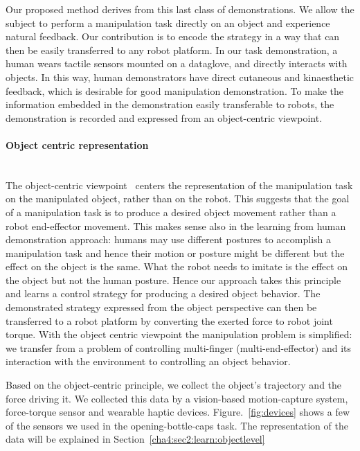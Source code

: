 Our proposed method derives from this last class of demonstrations.
We allow the subject to perform a manipulation task directly on an object and experience natural feedback. Our contribution is to
encode the strategy in a way that can then be
easily transferred to any robot platform. In our task demonstration, a human wears tactile sensors mounted on a dataglove, and directly
interacts with objects. In this way, human demonstrators have direct cutaneous and kinaesthetic feedback, which is desirable for good manipulation demonstration. To make the information embedded in the demonstration easily transferable to robots, the demonstration is recorded and expressed
from an object-centric viewpoint.


\paragraph{Object centric representation} ~\\
The object-centric
viewpoint~\citep{okamura2000overview,jain2013improving,Miao2014}
centers the representation of the manipulation task on the manipulated object, rather than on the robot. This suggests that the goal of a manipulation task is to produce a desired
object movement rather than a robot end-effector movement. This makes sense also in the learning from human demonstration approach: humans may use different postures to accomplish a manipulation task and hence their motion or posture might be different but the effect on the object is the same. What the robot needs to imitate is the effect on the object but not the human posture.
Hence our approach takes this principle and learns a control strategy for
producing a desired object behavior. The demonstrated strategy expressed from the object perspective can then be transferred to a robot platform by converting the exerted force to robot joint torque.
With the object centric viewpoint the manipulation problem is simplified: we transfer from a problem of controlling multi-finger (multi-end-effector) and its interaction with the environment to controlling an object behavior.

Based on the object-centric principle, we collect the object's trajectory and the force driving it. We collected this data by a vision-based motion-capture system,
force-torque sensor and wearable haptic
devices. Figure.~\ref{fig:devices} shows a few of the sensors we used
in the opening-bottle-caps task. The representation of the data will be explained in Section~\ref{cha4:sec2:learn:objectlevel}


